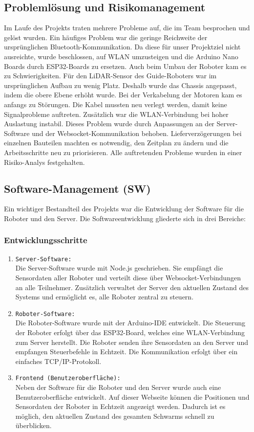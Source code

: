 \subsection{Problemlösung und Risikomanagement}
%
Im Laufe des Projekts traten mehrere Probleme auf, die im Team besprochen und gelöst wurden.
Ein häufiges Problem war die geringe Reichweite der ursprünglichen Bluetooth-Kommunikation. Da diese für unser Projektziel nicht ausreichte, wurde beschlossen, auf WLAN umzusteigen und die Arduino Nano Boards durch ESP32-Boards zu ersetzen.
Auch beim Umbau der Roboter kam es zu Schwierigkeiten. Für den LiDAR-Sensor des Guide-Roboters war im ursprünglichen Aufbau zu wenig Platz. Deshalb wurde das Chassis angepasst, indem die obere Ebene erhöht wurde.
Bei der Verkabelung der Motoren kam es anfangs zu Störungen. Die Kabel mussten neu verlegt werden, damit keine Signalprobleme auftreten.
Zusätzlich war die WLAN-Verbindung bei hoher Auslastung instabil. Dieses Problem wurde durch Anpassungen an der Server-Software und der Websocket-Kommunikation behoben.
Lieferverzögerungen bei einzelnen Bauteilen machten es notwendig, den Zeitplan zu ändern und die Arbeitsschritte neu zu priorisieren.
Alle auftretenden Probleme wurden in einer Risiko-Analys festgehalten.
\subsection{Software-Management (SW)}
%
Ein wichtiger Bestandteil des Projekts war die Entwicklung der Software für die Roboter und den Server.
Die Softwareentwicklung gliederte sich in drei Bereiche:
\subsubsection{Entwicklungsschritte}
\begin{enumerate}
    \item \texttt{Server-Software:} \\
    Die Server-Software wurde mit Node.js geschrieben. Sie empfängt die Sensordaten aller Roboter und verteilt diese über Websocket-Verbindungen an alle Teilnehmer.
    Zusätzlich verwaltet der Server den aktuellen Zustand des Systems und ermöglicht es, alle Roboter zentral zu steuern.
    \item \texttt{Roboter-Software:} \\
    Die Roboter-Software wurde mit der Arduino-IDE entwickelt.
    Die Steuerung der Roboter erfolgt über das ESP32-Board, welches eine WLAN-Verbindung zum Server herstellt.
    Die Roboter senden ihre Sensordaten an den Server und empfangen Steuerbefehle in Echtzeit.
    Die Kommunikation erfolgt über ein einfaches TCP/IP-Protokoll.
    \item \texttt{Frontend (Benutzeroberfläche):} \\
    Neben der Software für die Roboter und den Server wurde auch eine Benutzeroberfläche entwickelt.
    Auf dieser Webseite können die Positionen und Sensordaten der Roboter in Echtzeit angezeigt werden.
    Dadurch ist es möglich, den aktuellen Zustand des gesamten Schwarms schnell zu überblicken.  
    \end{enumerate}


